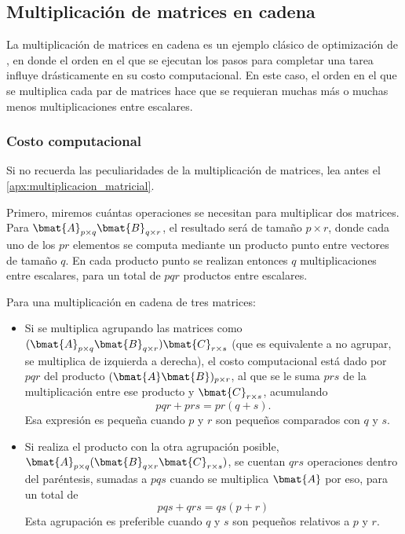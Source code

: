 \subsection{Multiplicación de matrices en cadena}

La multiplicación de matrices en cadena es un ejemplo clásico de optimización de , en donde el orden en el que se ejecutan los pasos para completar una tarea influye drásticamente en su costo computacional. En este caso, el orden en el que se multiplica cada par de matrices hace que se requieran muchas más o muchas menos multiplicaciones entre escalares.

\subsubsection{Costo computacional}

\begin{tip}
  Si no recuerda las peculiaridades de la multiplicación de matrices, lea antes el \ref{apx:multiplicacion_matricial}.
\end{tip}

Primero, miremos cuántas operaciones se necesitan para multiplicar dos matrices. Para $\bmat{A}_{p\times q} \bmat{B}_{q \times r}$, el resultado será de tamaño $p\times r$, donde cada uno de los $pr$ elementos se computa mediante un producto punto entre vectores de tamaño $q$. En cada producto punto se realizan entonces $q$ multiplicaciones entre escalares, para un total de $pqr$ productos entre escalares.

Para una multiplicación en cadena de tres matrices:
\begin{itemize}
  \item Si se multiplica agrupando las matrices como $(\bmat{A}_{p\times q} \bmat{B}_{q \times r}) \bmat{C}_{r \times s}$ (que es equivalente a no agrupar, se multiplica de izquierda a derecha), el costo computacional está dado por $pqr$ del producto $(\bmat{A}\bmat{B})_{p\times r}$, al que se le suma $prs$ de la multiplicación entre ese producto y $\bmat{C}_{r \times s}$, acumulando \[pqr + prs = pr(q+s).\] Esa expresión es pequeña cuando $p$ y $r$ son pequeños comparados con $q$ y $s$.
  \item Si realiza el producto con la otra agrupación posible, $\bmat{A}_{p\times q} (\bmat{B}_{q \times r} \bmat{C}_{r \times s})$, se cuentan $qrs$ operaciones dentro del paréntesis, sumadas a $pqs$ cuando se multiplica $\bmat{A}$ por eso, para un total de \[pqs + qrs = qs(p+r)\] Esta agrupación es preferible cuando $q$ y $s$ son pequeños relativos a $p$ y $r$.
\end{itemize}
   
